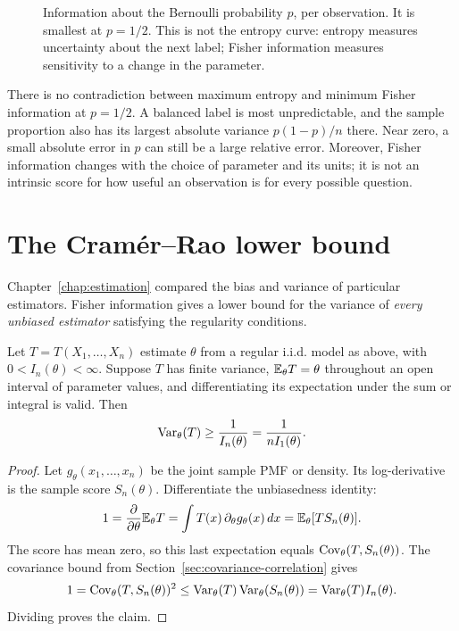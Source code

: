 \begin{figure}[H]
  \centering\InfoFisherPlot
  \caption{Information about the Bernoulli probability \(p\), per
  observation. It is smallest at \(p=1/2\). This is not the entropy
  curve: entropy measures uncertainty about the next label; Fisher
  information measures sensitivity to a change in the parameter.}
  \label{fig:bernoulli-fisher}
\end{figure}

There is no contradiction between maximum entropy and minimum Fisher
information at \(p=1/2\). A balanced label is most unpredictable, and the
sample proportion also has its largest absolute variance \(p(1-p)/n\)
there. Near zero, a small absolute error in \(p\) can still be a large
relative error. Moreover, Fisher information changes with the choice
of parameter and its units; it is not an intrinsic score for how useful
an observation is for every possible question.

\section{The Cramér--Rao lower bound}
\label{sec:cramer-rao}

Chapter~\ref{chap:estimation} compared the bias and variance of particular
estimators. Fisher information gives a lower bound for the variance of
\emph{every unbiased estimator} satisfying the regularity conditions.

\begin{theorem}
Let \(T=T(X_1,\ldots,X_n)\) estimate \(\theta\) from a regular i.i.d.
model as above, with \(0<I_n(\theta)<\infty\).
Suppose \(T\) has finite variance, \(\mathbb{E}_\theta T=\theta\)
throughout an open interval of parameter values, and differentiating
its expectation under the sum or integral is valid. Then
\begin{equation}
  \operatorname{Var}_\theta(T)\ge\frac1{I_n(\theta)}
                 =\frac1{nI_1(\theta)}.
  \label{eq:cramer-rao}
\end{equation}
\end{theorem}

\begin{proof}
Let \(g_\theta(x_1,\ldots,x_n)\) be the joint sample PMF or density.
Its log-derivative is the sample score \(S_n(\theta)\).
Differentiate the unbiasedness identity:
\[
  1=\frac{\partial}{\partial\theta}\mathbb{E}_\theta T
   =\int T(x)\,\partial_\theta g_\theta(x)\,dx
   =\mathbb{E}_\theta[T S_n(\theta)].
\]
The score has mean zero, so this last expectation equals
\(\operatorname{Cov}_\theta(T,S_n(\theta))\). The covariance bound from
Section~\ref{sec:covariance-correlation} gives
\[
  1=\operatorname{Cov}_\theta(T,S_n(\theta))^2
    \le\operatorname{Var}_\theta(T)\operatorname{Var}_\theta(S_n(\theta))
    =\operatorname{Var}_\theta(T)I_n(\theta).
\]
Dividing proves the claim.
\end{proof}

